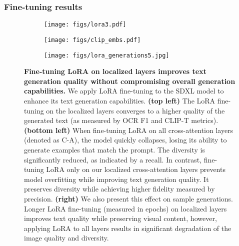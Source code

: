 \subsubsection{Fine-tuning results}

\begin{figure}
    \centering
    \begin{subfigure}[b]{0.54\textwidth}
        \centering
        \texttt{[image: figs/lora3.pdf]}
        \label{fig:lora_ocr}

        \centering
        \texttt{[image: figs/clip\_embs.pdf]}
        \label{fig:clip_embs}
    \end{subfigure}
    \begin{subfigure}[b]{0.45\textwidth} %
        \centering
        \texttt{[image: figs/lora\_generations5.jpg]}
        \label{fig:third_plot}
    \end{subfigure}

    \caption{\textbf{Fine-tuning LoRA on localized layers improves text generation quality without compromising overall generation capabilities.}
        We apply LoRA fine-tuning to the SDXL model to enhance its text generation capabilities.
        \textbf{(top left)} The LoRA fine-tuning on the localized layers converges to a higher quality of the generated text (as measured by OCR F1 and CLIP-T metrics).
        \textbf{(bottom left)} When fine-tuning LoRA on all cross-attention layers (denoted as C-A), the model quickly collapses, losing its ability to generate examples that match the prompt. The diversity is significantly reduced, as indicated by a recall. In contrast, fine-tuning LoRA only on our localized cross-attention layers prevents model overfitting while improving text generation quality. It preserves diversity while achieving higher fidelity measured by precision.
        \textbf{(right)} We also present this effect on sample generations. Longer LoRA fine-tuning (measured in epochs) on localized layers improves text quality while preserving visual content, however, applying LoRA to all layers results in significant degradation of the image quality and diversity.
    }
    \label{fig:lora_plots}
    \vspace{-1em}
\end{figure}




